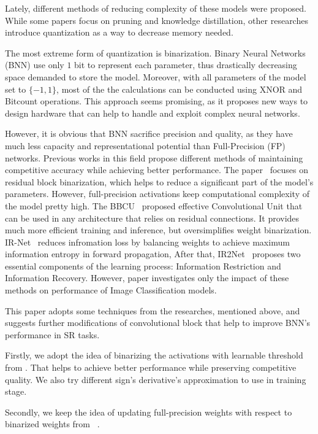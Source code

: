 \documentclass{article}
\begin{document}
Lately, different methods of reducing complexity of these models were proposed. While some papers focus on pruning and knowledge distillation, other researches introduce quantization as a way to decrease memory needed.

The most extreme form of quantization is binarization. Binary Neural Networks (BNN) use only $1$ bit to represent each parameter, thus drastically decreasing space demanded to store the model. Moreover, with all parameters of the model set to $\{-1, 1\}$, most of the the calculations can be conducted using XNOR and Bitcount operations. This approach seems promising, as it proposes new ways to design hardware that can help to handle and exploit complex neural networks.

However, it is obvious that BNN sacrifice precision and quality, as they have much less capacity and representational potential than Full-Precision (FP) networks. Previous works in this field propose different methods of maintaining competitive accuracy while achieving better performance. The paper~\cite{ma2019efficient} focuses on residual block binarization, which helps to reduce a significant part of the model's parameters. However, full-precision activations keep computational complexity of the model pretty high. The BBCU~\cite{xia2022basic} proposed effective Convolutional Unit that can be used in any architecture that relies on residual connections. It provides much more efficient training and inference, but oversimplifies weight binarization. IR-Net~\cite{qin2020forward} reduces infromation loss by balancing weights to achieve maximum information entropy in forward propagation, After that, IR2Net~\cite{xue2022ir2net} proposes two essential components of the learning process: Information Restriction and Information Recovery. However, paper investigates only the impact of these methods on performance of Image Classification models. 

This paper adopts some techniques from the researches, mentioned above, and suggests further modifications of convolutional block that help to improve BNN's performance in SR tasks.

Firstly, we adopt the idea of binarizing the activations with learnable threshold from \cite{xia2022basic}. That helps to achieve better performance while preserving competitive quality. We also try different sign's derivative's approximation to use in training stage.

Secondly, we keep the idea of updating full-precision weights with respect to binarized weights from ~\cite{ma2019efficient}. 
\end{document}
